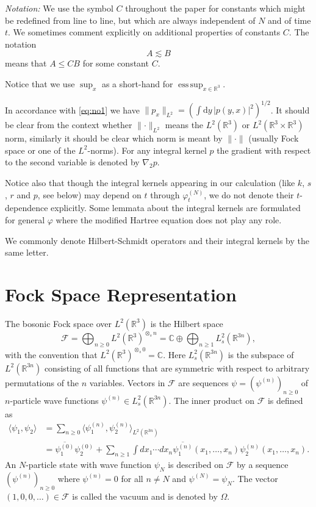 \documentclass[11pt,a4paper,DIV11]{scrartcl}	%
\newcommand{\R}{\mathds{R}}
\newcommand{\di}{\textrm{d}}		%
\newcommand{\Rbb}{\mathbb{R}}		%
\newcommand{\norm}[1]{\lVert#1\rVert}	%
\newcommand{\ph}{\varphi_t^{(N)}}	%
\newcommand{\eqr}[1]{\eqref{eq:#1}}			%
\begin{document}
\emph{Notation:} We use the symbol $C$ throughout the paper for constants which might be redefined from line to line, but which are always independent of $N$ and of time $t$. We sometimes comment explicitly on additional properties of constants $C$.
The notation
\[
  A \apprle B
\]
means that $A \le C B$ for some constant $C$.

Notice that we use $\sup_x$ as a short-hand for $\operatorname{ess\,sup}_{x\in \Rbb^3}$.

In accordance with \eqr{no1} we have $\norm{p_x}_{L^2} = \left( \int \di y\,
\lvert p(y,x)\rvert^2 \right)^{1/2}$. It should be clear from the context
whether $\norm{\cdot}_{L^2}$ means the $L^2(\Rbb^3)$ or $L^2(\Rbb^3 \times \Rbb^3)$ norm, similarly it should be clear which norm is meant by $\norm{\cdot}$ (usually Fock space or one of the $L^2$-norms).
For any integral kernel $p$ the gradient with respect to the second variable is denoted by $\nabla_2 p$.

Notice also that though the integral kernels appearing in our calculation (like $k$, $s$, $r$ and $p$, see below) may depend on $t$ through $\ph$, we do not denote their $t$-dependence explicitly. Some lemmata about the integral kernels are formulated for general $\varphi$ where the modified Hartree equation does not play any role.

We commonly denote Hilbert-Schmidt operators and their integral kernels by the same letter.

\section{Fock Space Representation}
\label{s:fock}
The bosonic Fock space over $L^2(\R^3)$ is the Hilbert space
\[
  \mathcal{F} = \bigoplus_{n \ge 0} L^2(\R^3)^{\otimes_s n} = \mathds{C}
  \oplus \bigoplus_{n \ge 1} L^2_s(\R^{3n}),
\]
with the convention that $L^2(\R^3)^{\otimes_s 0} = \mathds{C}$. Here
$L^2_s(\R^{3n})$ is the subspace of $L^2(\R^{3n})$ consisting of all functions
that are symmetric with respect to arbitrary permutations of the $n$
variables. Vectors in $\mathcal{F}$ are sequences $\psi = (\psi^{(n)})_{n
\ge 0}$ of $n$-particle wave functions $\psi^{(n)} \in L^2_s(\R^{3n})$. The
inner product on $\mathcal{F}$ is defined as
\begin{align*}
  \langle \psi_1, \psi_2 \rangle & = \sum_{n \ge 0} \langle \psi_1^{(n)},
  \psi_2^{(n)} \rangle_{L^2(\R^{3n})} \\
  & = \overline{\psi_1^{(0)}} \psi_2^{(0)} + \sum_{n \ge 1} \int dx_1 \cdots
  dx_n \overline{\psi_1^{(n)}}(x_1, \dots, x_n) \psi_2^{(n)}(x_1, \dots, x_n).
\end{align*}
An $N$-particle state with wave function $\psi_N$ is described on
$\mathcal{F}$ by a sequence $(\psi^{(n)})_{n \ge 0}$ where $\psi^{(n)} =
0$ for all $n \neq N$ and $\psi^{(N)} = \psi_N$. The vector $(1, 0, 0, \dots
) \in \mathcal{F}$ is called the vacuum and is denoted by $\Omega$.
\end{document}
